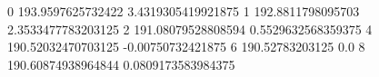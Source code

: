 0 193.9597625732422 3.4319305419921875
1 192.8811798095703 2.3533477783203125
2 191.08079528808594 0.5529632568359375
4 190.52032470703125 -0.00750732421875
6 190.52783203125 0.0
8 190.60874938964844 0.0809173583984375
